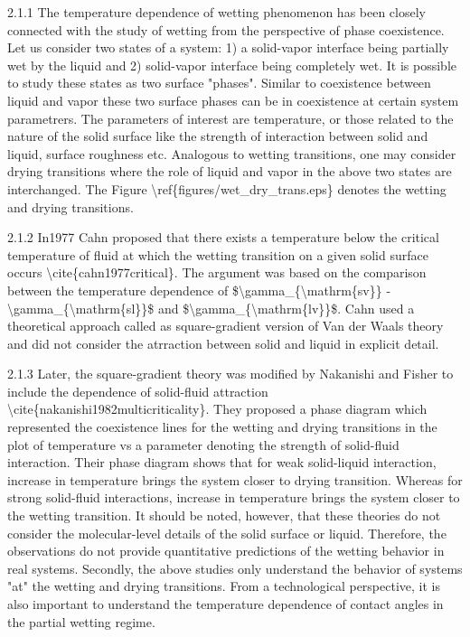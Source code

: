 \par 2.1.1 The temperature dependence of wetting phenomenon has been closely connected with the study of wetting  from the perspective of phase coexistence. Let us consider two states of a system: 1) a solid-vapor interface being partially wet by the liquid and 2) solid-vapor interface being completely wet. It is possible to study these states as two surface "phases". Similar to coexistence between liquid and vapor these two surface phases can be in coexistence at certain system parametrers. The parameters of interest are temperature, or those related to the nature of the solid surface like the strength of interaction between solid and liquid, surface roughness etc. Analogous to wetting transitions, one may consider drying transitions where the role of liquid and vapor in the above two states are interchanged. The Figure \textbackslash ref\{figures/wet\_dry\_trans.eps\} denotes the wetting and drying transitions.
\par 2.1.2 In1977 Cahn proposed that there exists a temperature below the critical temperature of fluid at which the wetting transition on a given solid surface occurs \textbackslash cite\{cahn1977critical\}. The argument was based on the comparison between the temperature dependence of \$\textbackslash gamma\_\{\textbackslash mathrm\{sv\}\} - \textbackslash gamma\_\{\textbackslash mathrm\{sl\}\}\$  and \$\textbackslash gamma\_\{\textbackslash mathrm\{lv\}\}\$. Cahn used a theoretical approach called as square-gradient version of Van der Waals theory and did not consider the atrraction between solid and liquid in explicit detail.
\par 2.1.3 Later, the square-gradient theory was modified by Nakanishi and Fisher to include the dependence of solid-fluid attraction \textbackslash cite\{nakanishi1982multicriticality\}. They proposed a phase diagram which represented the coexistence lines for the wetting and drying transitions in the plot of temperature vs a parameter denoting the strength of solid-fluid interaction. Their phase diagram shows that for weak solid-liquid interaction, increase in temperature brings the system closer to drying transition. Whereas for strong solid-fluid interactions, increase in temperature brings the system closer to the wetting transition. It should be noted, however, that  these theories do not consider the molecular-level details of the solid surface or liquid. Therefore, the observations do not provide quantitative predictions of the wetting behavior in real systems. Secondly, the above studies only understand the behavior of systems "at" the wetting and drying transitions. From a technological perspective, it is also important to understand the temperature dependence of contact angles in the partial wetting regime.
